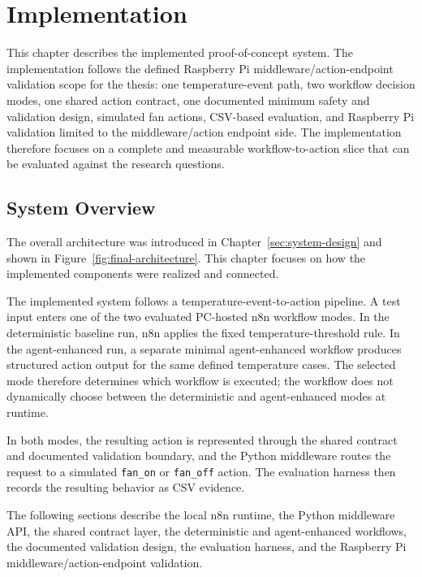 \section{Implementation}\label{sec:implementation}




This chapter describes the implemented proof-of-concept system. The implementation follows the defined Raspberry Pi middleware/action-endpoint validation scope for the thesis: one temperature-event path, two workflow decision modes, one shared action contract, one documented minimum safety and validation design, simulated fan actions, CSV-based evaluation, and Raspberry Pi validation limited to the middleware/action endpoint side. The implementation therefore focuses on a complete and measurable workflow-to-action slice that can be evaluated against the research questions.




\subsection{System Overview}\label{subsec:implementation-system-overview}

The overall architecture was introduced in Chapter~\ref{sec:system-design} and shown in Figure~\ref{fig:final-architecture}. This chapter focuses on how the implemented components were realized and connected.

The implemented system follows a temperature-event-to-action pipeline. A test input enters one of the two evaluated PC-hosted n8n workflow modes. In the deterministic baseline run, n8n applies the fixed temperature-threshold rule. In the agent-enhanced run, a separate minimal agent-enhanced workflow produces structured action output for the same defined temperature cases. The selected mode therefore determines which workflow is executed; the workflow does not dynamically choose between the deterministic and agent-enhanced modes at runtime.

In both modes, the resulting action is represented through the shared contract and documented validation boundary, and the Python middleware routes the request to a simulated \texttt{fan\_on} or \texttt{fan\_off} action. The evaluation harness then records the resulting behavior as CSV evidence.

The following sections describe the local n8n runtime, the Python middleware API, the shared contract layer, the deterministic and agent-enhanced workflows, the documented validation design, the evaluation harness, and the Raspberry Pi middleware/action-endpoint validation.


